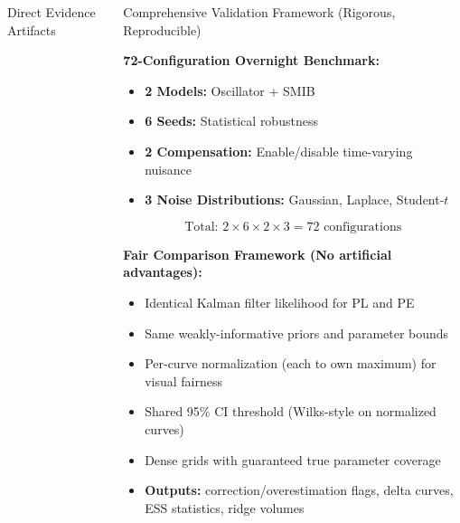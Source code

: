 \documentclass[final,hyperref={pdfpagelabels=false}]{beamer}
\begin{document}
\begin{frame}[t]
\begin{columns}[t,totalwidth=\textwidth]
\begin{column}{0.36\textwidth}
\begin{exampleblock}{Direct Evidence Artifacts}
\vspace{0.3cm}

\begin{center}
\end{center}

\end{exampleblock}

\end{column}

\begin{column}{0.32\textwidth}

\begin{block}{Comprehensive Validation Framework (Rigorous, Reproducible)}
\small

\textbf{72-Configuration Overnight Benchmark:}
\begin{itemize}
\item \textbf{2 Models:} Oscillator + SMIB
\item \textbf{6 Seeds:} Statistical robustness  
\item \textbf{2 Compensation:} Enable/disable time-varying nuisance
\item \textbf{3 Noise Distributions:} Gaussian, Laplace, Student-$t$
\end{itemize}

\begin{equation}
\text{Total: } 2 \times 6 \times 2 \times 3 = 72 \text{ configurations}
\end{equation}

\textbf{Fair Comparison Framework (No artificial advantages):}
\begin{itemize}
\item Identical Kalman filter likelihood for PL and PE
\item Same weakly-informative priors and parameter bounds
\item Per-curve normalization (each to own maximum) for visual fairness
\item Shared 95\% CI threshold (Wilks-style on normalized curves)
\item Dense grids with guaranteed true parameter coverage
\item \textbf{Outputs:} correction/overestimation flags, delta curves, ESS statistics, ridge volumes
\end{itemize}


\end{block}
\end{column}
\end{columns}
\end{frame}
\end{document}
